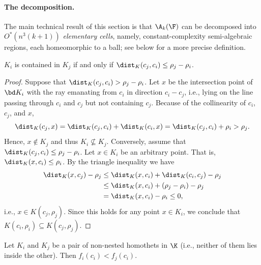 \paragraph{The decomposition.}
\fi
The main technical result of this section is that $\A_k(\F)$ can be decomposed into 
$O^*(n^3(k+1))$ \emph{elementary cells}, namely, constant-complexity semi-algebraic regions, 
each homeomorphic to a ball; see below for a more precise definition.
%
\iffullver
\begin{lemma}
\label{lem:nested}
$K_i$ is contained in $K_j$ if and only if $\dist_K(c_j,c_i) \le \rho_j -\rho_i$.
\end{lemma}
\begin{proof}
Suppose that $\dist_K(c_j,c_i) > \rho_j -\rho_i$. Let $x$ be the intersection point of 
$\bd K_i$ with the ray emanating from $c_i$ in direction $c_i-c_j$, i.e., lying on the 
line passing through $c_i$ and $c_j$ but not containing $c_j$. Because of the collinearity 
of $c_i$, $c_j$, and $x$,
\[ 
\dist_K(c_j, x) = \dist_K(c_j,c_i) + \dist_K(c_i,x) = \dist_K(c_j,c_i)+\rho_i > \rho_j.
\]
Hence, $x\not\in K_j$ and thus $K_i \not\subseteq K_j$. Conversely, assume 
that $\dist_K(c_j,c_i) \le \rho_j -\rho_i$.
Let $x\in K_i$ be an arbitrary point. That is, $\dist_K(x,c_i) \le \rho_i$.
By the triangle inequality we have
\begin{align*} 
	\dist_K(x,c_j) - \rho_j & \le \dist_K(x,c_i) + \dist_K(c_i,c_j) - \rho_j \\
		& \le \dist_K(x,c_i) + (\rho_j - \rho_i) - \rho_j \\
		& = \dist_K(x,c_i) - \rho_i \le 0,
\end{align*}
i.e., $x\in K(c_j,\rho_j)$. Since this holds for any point $x\in K_i$, we conclude that
$K(c_i,\rho_i) \subseteq K(c_j,\rho_j)$.
\end{proof}
%
\begin{lemma} \label{lem:c0in}
	Let $K_i$ and $K_j$ be a pair of non-nested homothets in $\K$ (i.e., neither of them lies inside the other). Then $f_i(c_i) < f_j(c_i)$.
\end{lemma}
